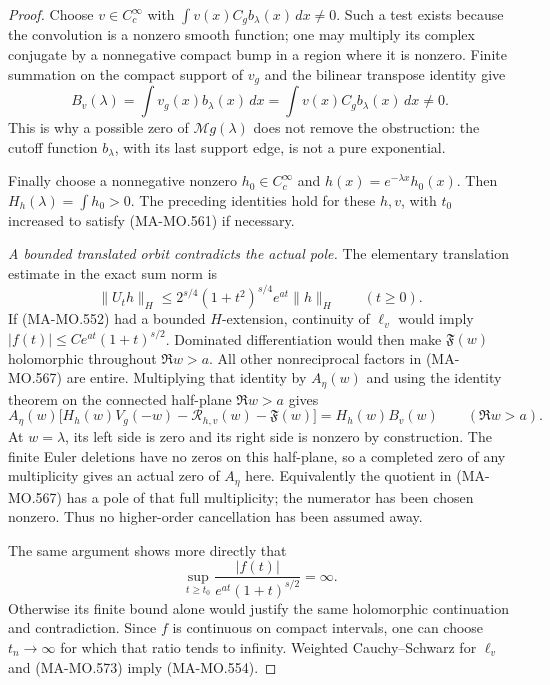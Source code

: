 \begin{proof}
Choose \(v\in C_c^\infty\) with
\(\int v(x)C_gb_\lambda(x)\,dx\ne0\). Such a test
exists because the convolution is a nonzero smooth
function; one may multiply its complex conjugate by
a nonnegative compact bump in a region where it is
nonzero. Finite summation on the compact support of
\(v_g\) and the bilinear transpose identity give
\[
            B_v(\lambda)
               =\int v_g(x)b_\lambda(x)\,dx
               =\int v(x)C_gb_\lambda(x)\,dx\ne0 .
 \tag{MA-MO.572}
\]
This is why a possible zero of \(\mathcal Mg(\lambda)\)
does not remove the obstruction: the cutoff function
\(b_\lambda\), with its last support edge, is not a
pure exponential.

Finally choose a nonnegative nonzero
\(h_0\in C_c^\infty\) and \(h(x)=e^{-\lambda x}h_0(x)\).
Then \(H_h(\lambda)=\int h_0>0\). The preceding
identities hold for these \(h,v\), with \(t_0\)
increased to satisfy (MA-MO.561) if necessary.

\emph{A bounded translated orbit contradicts the actual pole.}
The elementary translation estimate in the exact sum norm is
\[
 \|U_th\|_H
    \le 2^{s/4}(1+t^2)^{s/4}e^{at}\|h\|_H
                                  \qquad(t\ge0).
 \tag{MA-MO.573}
\]
If (MA-MO.552) had a bounded \(H\)-extension, continuity
of \(\ell_v\) would imply
\(|f(t)|\le C e^{at}(1+t)^{s/2}\). Dominated
differentiation would then make \(\mathfrak F(w)\)
holomorphic throughout \(\Re w>a\). All other
nonreciprocal factors in (MA-MO.567) are entire.
Multiplying that identity by \(A_\eta(w)\) and using
the identity theorem on the connected half-plane
\(\Re w>a\) gives
\[
 A_\eta(w)\bigl[
      H_h(w)V_g(-w)-\mathcal R_{h,v}(w)-\mathfrak F(w)
            \bigr]=H_h(w)B_v(w)
                      \qquad(\Re w>a).
 \tag{MA-MO.574}
\]
At \(w=\lambda\), its left side is zero and its right
side is nonzero by construction. The finite Euler
deletions have no zeros on this half-plane, so a
completed zero of any multiplicity gives an actual
zero of \(A_\eta\) here. Equivalently the quotient
in (MA-MO.567) has a pole of that full multiplicity;
the numerator has been chosen nonzero. Thus no
higher-order cancellation has been assumed away.

The same argument shows more directly that
\[
       \sup_{t\ge t_0}
          \frac{|f(t)|}{e^{at}(1+t)^{s/2}}=\infty .
 \tag{MA-MO.575}
\]
Otherwise its finite bound alone would justify the same
holomorphic continuation and contradiction. Since \(f\)
is continuous on compact intervals, one can choose
\(t_n\to\infty\) for which that ratio tends to infinity.
Weighted Cauchy--Schwarz for \(\ell_v\) and
(MA-MO.573) imply (MA-MO.554).


\end{proof}

